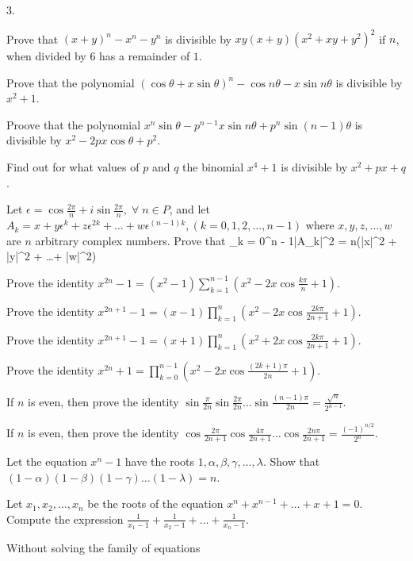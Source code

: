   $3$.
\item Prove that $(x + y)^n - x^n - y^n$ is divisible by $xy(x + y)(x^2 + xy + y^2)^2$ if $n$, when divided by $6$ has a remainder
  of $1$.
\item Prove that the polynomial $(\cos\theta + x\sin\theta)^n - \cos n\theta - x\sin n\theta$ is divisible by $x^2 + 1$.
\item Proove that the polynomial $x^n\sin\theta - p^{n - 1}x\sin n\theta + p^n\sin(n - 1)\theta$ is divisible by $x^2 -
  2px\cos\theta + p^2$.
\item Find out for what values of $p$ and $q$ the binomial $x^4 + 1$ is divisible by $x^2 + px + q$.
\item Let $\epsilon = \cos\frac{2\pi}{n} + i\sin\frac{2\pi}{n}, \;\forall\;n\in P$, and let $A_k = x + y\epsilon^k + z\epsilon^{2k} +
  \ldots + w\epsilon^{(n - 1)k}, (k = 0, 1, 2, \ldots, n - 1)$ where $x, y, z, \ldots, w$ are $n$ arbitrary complex numbers. Prove
  that \startformula \sum_{k = 0}^{n - 1}|A_k|^2 = n(|x|^2 + |y|^2 + \ldots + |w|^2)\stopformula
\item Prove the identity $x^{2n} - 1 = (x^2 - 1)\sum_{k = 1}^{n - 1}\left(x^2 - 2x\cos\frac{k\pi}{n} + 1\right)$.
\item Prove the identity $x^{2n + 1} - 1 = (x - 1)\prod_{k = 1}^n\left(x^2 - 2x\cos\frac{2k\pi}{2n + 1} + 1\right)$.
\item Prove the identity $x^{2n + 1} - 1 = (x + 1)\prod_{k = 1}^n\left(x^2 + 2x\cos\frac{2k\pi}{2n + 1} + 1\right)$.
\item Prove the identity $x^{2n} + 1 = \prod_{k = 0}^{n - 1}\left(x^2 - 2x\cos\frac{(2k + 1)\pi}{2n} + 1\right)$.
\item If $n$ is even, then prove the identity $\sin\frac{\pi}{2n}\sin\frac{2\pi}{2n}\ldots \sin\frac{(n - 1)\pi}{2n} =
  \frac{\sqrt{n}}{2^{n - 1}}$.
\item If $n$ is even, then prove the identity $\cos\frac{2\pi}{2n + 1}\cos\frac{4\pi}{2n + 1}\ldots\cos\frac{2n\pi}{2n + 1} =
  \frac{(-1)^{n/2}}{2^n}$.
\item Let the equation $x^n - 1$ have the roots $1, \alpha, \beta, \gamma, \ldots, \lambda$. Show that $(1 - \alpha)(1 - \beta)(1 -
  \gamma)\ldots(1 - \lambda) = n$.
\item Let $x_1, x_2, \ldots, x_n$ be the roots of the equation $x^n + x^{n - 1} + \ldots + x + 1 = 0$. Compute the expression
  $\frac{1}{x_1 - 1} + \frac{1}{x_2 - 1} + \ldots + \frac{1}{x_n - 1}$.
\item Without solving the family of equations
